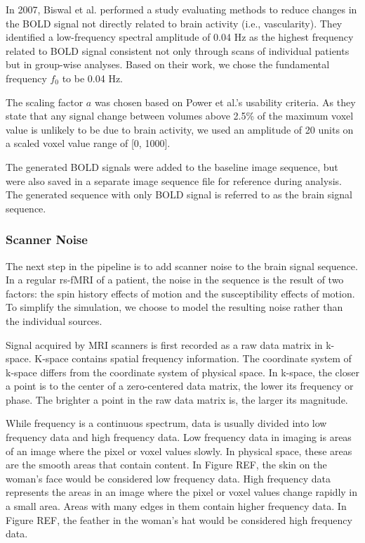 In 2007, Biswal et al. performed a study evaluating methods to reduce changes in the BOLD signal not directly related to brain activity (i.e., vascularity). They identified a low-frequency spectral amplitude of 0.04 Hz as the highest frequency related to BOLD signal consistent not only through scans of individual patients but in group-wise analyses. Based on their work, we chose the fundamental frequency $f_0$ to be 0.04 Hz. %

The scaling factor $a$ was chosen based on Power et al.'s usability criteria. As they state that any signal change between volumes above 2.5\% of the maximum voxel value is unlikely to be due to brain activity, we used an amplitude of 20 units on a scaled voxel value range of [0, 1000]. %

The generated BOLD signals were added to the baseline image sequence, but were also saved in a separate image sequence file for reference during analysis. The generated sequence with only BOLD signal is referred to as the brain signal sequence.

\subsubsection{Scanner Noise}

The next step in the pipeline is to add scanner noise to the brain signal sequence. In a regular rs-fMRI of a patient, the noise in the sequence is the result of two factors: the spin history effects of motion and the susceptibility effects of motion. To simplify the simulation, we choose to model the resulting noise rather than the individual sources.

Signal acquired by MRI scanners is first recorded as a raw data matrix in k-space. K-space contains spatial frequency information. The coordinate system of k-space differs from the coordinate system of physical space. In k-space, the closer a point is to the center of a zero-centered data matrix, the lower its frequency or phase. The brighter a point in the raw data matrix is, the larger its magnitude. 

While frequency is a continuous spectrum, data is usually divided into low frequency data and high frequency data. Low frequency data in imaging is areas of an image where the pixel or voxel values slowly. In physical space, these areas are the smooth areas that contain content. In Figure REF, the skin on the woman's face would be considered low frequency data. High frequency data represents the areas in an image where the pixel or voxel values change rapidly in a small area. Areas with many edges in them contain higher frequency data. In Figure REF, the feather in the woman's hat would be considered high frequency data. %

